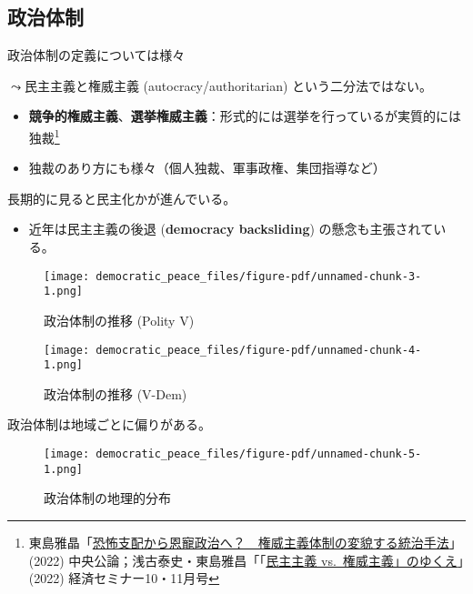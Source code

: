 \documentclass[
  xelatex,
  ja=standard]{bxjsarticle}
\providecommand{\tightlist}{%
  \setlength{\itemsep}{0pt}\setlength{\parskip}{0pt}}\usepackage{longtable,booktabs,array}
\begin{document}
\hypertarget{ux653fux6cbbux4f53ux5236}{%
\subsection{政治体制}\label{ux653fux6cbbux4f53ux5236}}

政治体制の定義については様々

\(\leadsto\)民主主義と権威主義 (autocracy/authoritarian)
という二分法ではない。

\begin{itemize}
\tightlist
\item
  \textbf{競争的権威主義}、\textbf{選挙権威主義}：形式的には選挙を行っているが実質的には独裁\citep{gandhi2009}\footnote{東島雅晶「\href{https://chuokoron.jp/politics/118651.html}{恐怖支配から恩寵政治へ？　権威主義体制の変貌する統治手法}」(2022)
    中央公論；浅古泰史・東島雅昌「「\href{https://www.web-nippyo.jp/29067/}{民主主義
    vs.~権威主義」のゆくえ}」(2022) 経済セミナー10・11月号}
\item
  独裁のあり方にも様々（個人独裁、軍事政権、集団指導など）
\end{itemize}

長期的に見ると民主化かが進んでいる。

\begin{itemize}
\tightlist
\item
  近年は民主主義の後退 (\textbf{democracy backsliding})
  の懸念も主張されている。
\end{itemize}

\begin{figure}[htpb]

{\centering \texttt{[image: democratic\_peace\_files/figure-pdf/unnamed-chunk-3-1.png]}

}

\caption{政治体制の推移 (Polity V)}

\end{figure}

\begin{figure}[htpb]

{\centering \texttt{[image: democratic\_peace\_files/figure-pdf/unnamed-chunk-4-1.png]}

}

\caption{政治体制の推移 (V-Dem)}

\end{figure}

政治体制は地域ごとに偏りがある。

\begin{figure}[htpb]

{\centering \texttt{[image: democratic\_peace\_files/figure-pdf/unnamed-chunk-5-1.png]}

}

\caption{政治体制の地理的分布}

\end{figure}
\end{document}
